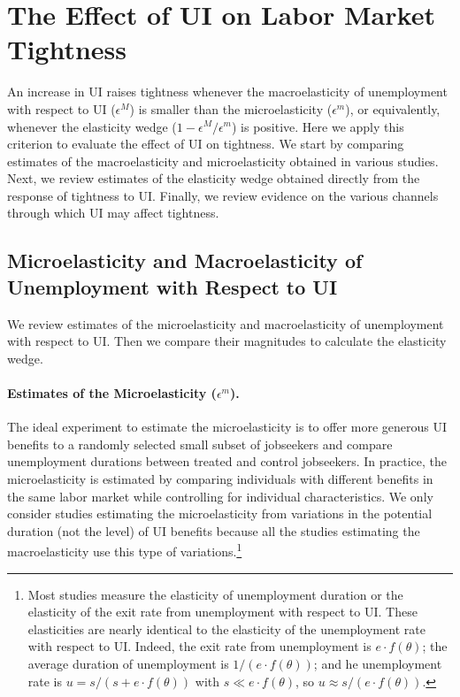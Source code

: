 \documentclass[letterpaper,12pt,leqno]{article}
\def \e{{\epsilon}}
\def \t{{\theta}}
\begin{document}
\section{The Effect of UI on Labor Market Tightness}\label{sec:wedge}

An increase in UI raises tightness whenever the macroelasticity of unemployment with respect to UI ($\e^{M}$) is smaller than the microelasticity ($\e^{m}$), or equivalently, whenever the elasticity wedge ($1-\e^{M}/\e^{m}$) is positive. Here we apply this criterion to evaluate the effect of UI on tightness. We start by comparing estimates of the macroelasticity and microelasticity obtained in various studies. Next, we review estimates of the elasticity wedge obtained directly from the response of tightness to UI. Finally, we review evidence on the various channels through which UI may affect tightness.

\subsection{Microelasticity and Macroelasticity of Unemployment with Respect to UI}

We review estimates of the microelasticity and macroelasticity of unemployment with respect to UI. Then we compare their magnitudes to calculate the elasticity wedge. 

\paragraph{Estimates of the Microelasticity ($\e^m$).} The ideal experiment to estimate the microelasticity is to offer more generous UI benefits to a randomly selected small subset of jobseekers and compare unemployment durations between treated and control jobseekers. In practice, the microelasticity is estimated by comparing individuals with different benefits in the same labor market while controlling for individual characteristics. We only consider studies estimating the microelasticity from variations in the potential duration (not the level) of UI benefits because all the studies estimating the macroelasticity use this type of variations.\footnote{Most studies measure the elasticity of unemployment duration or the elasticity of the exit rate from unemployment with respect to UI. These elasticities are nearly identical to the elasticity of the unemployment rate with respect to UI. Indeed, the exit rate from unemployment is $e\cdot f(\t)$; the average duration of unemployment is $1/(e\cdot f(\t))$; and he unemployment rate is $u=s/(s+e\cdot f(\t))$ with $s\ll e\cdot f(\t)$, so $u\approx s/(e\cdot f(\t))$.}
\end{document}
